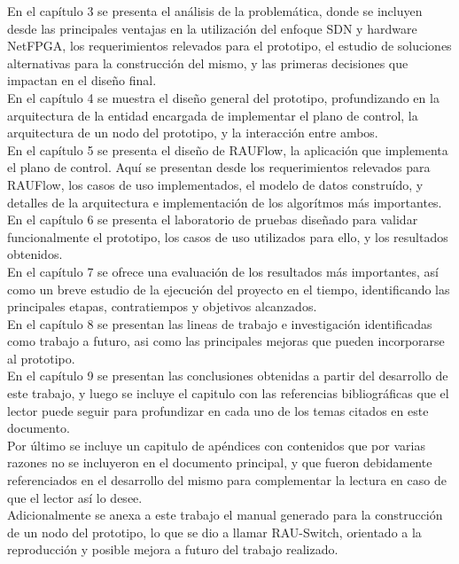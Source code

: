 En el cap\'itulo 3 se presenta el análisis de la problemática, donde se incluyen desde las principales ventajas en la utilización del enfoque SDN y hardware NetFPGA, los requerimientos relevados para el prototipo, el estudio de soluciones alternativas para la construcción del mismo, y las primeras decisiones que impactan en el diseño final.\\

En el cap\'itulo 4 se muestra el diseño general del prototipo, profundizando en la arquitectura de la entidad encargada de implementar el plano de control, la arquitectura de un nodo del prototipo, y la interacción entre ambos.\\

En el cap\'itulo 5 se presenta el diseño de RAUFlow, la aplicaci\'on que implementa el plano de control. Aquí se presentan desde los requerimientos relevados para RAUFlow, los casos de uso implementados, el modelo de datos constru\'ido, y detalles de la arquitectura e implementaci\'on de los algor\'itmos m\'as importantes.\\

En el cap\'itulo 6 se presenta el laboratorio de pruebas diseñado para validar funcionalmente el prototipo, los casos de uso utilizados para ello, y los resultados obtenidos.\\

En el cap\'itulo 7 se ofrece una evaluación de los resultados m\'as importantes, así como un breve estudio de la ejecuci\'on del proyecto en el tiempo, identificando las principales etapas, contratiempos y objetivos alcanzados.\\

En el cap\'itulo 8 se presentan las lineas de trabajo e investigaci\'on identificadas como trabajo a futuro, asi como las principales mejoras que pueden incorporarse al prototipo.\\

En el cap\'itulo 9 se presentan las conclusiones obtenidas a partir del desarrollo de este trabajo, y luego se incluye el capitulo con las referencias bibliográficas que el lector puede seguir para profundizar en cada uno de los temas citados en este documento.\\

Por \'ultimo se incluye un capitulo de ap\'endices con contenidos que por varias razones no se incluyeron en el documento principal, y que fueron debidamente referenciados en el desarrollo del mismo para complementar la lectura en caso de que el lector así lo desee.\\

Adicionalmente se anexa a este trabajo el manual generado para la construcci\'on de un nodo del prototipo, lo que se dio a llamar RAU-Switch, orientado a la reproducci\'on y posible mejora a futuro del trabajo realizado.

 
